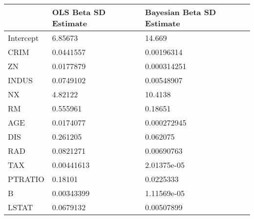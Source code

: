 \begin{tabular}{lll}
\hline
           & OLS Beta SD Estimate   & Bayesian Beta SD Estimate   \\
\hline
 Intercept & 6.85673                & 14.669                      \\
 CRIM      & 0.0441557              & 0.00196314                  \\
 ZN        & 0.0177879              & 0.000314251                 \\
 INDUS     & 0.0749102              & 0.00548907                  \\
 NX        & 4.82122                & 10.4138                     \\
 RM        & 0.555961               & 0.18651                     \\
 AGE       & 0.0174077              & 0.000272945                 \\
 DIS       & 0.261205               & 0.062075                    \\
 RAD       & 0.0821271              & 0.00690763                  \\
 TAX       & 0.00441613             & 2.01375e-05                 \\
 PTRATIO   & 0.18101                & 0.0225333                   \\
 B         & 0.00343399             & 1.11569e-05                 \\
 LSTAT     & 0.0679132              & 0.00507899                  \\
\hline
\end{tabular}